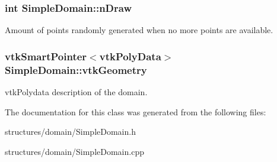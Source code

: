 \subsubsection[{\texorpdfstring{n\+Draw}{nDraw}}]{\setlength{\rightskip}{0pt plus 5cm}int Simple\+Domain\+::n\+Draw\hspace{0.3cm}{\ttfamily [private]}}\hypertarget{class_simple_domain_a3558a17833f49034ea65a9d6640403c4}{}\label{class_simple_domain_a3558a17833f49034ea65a9d6640403c4}
Amount of points randomly generated when no more points are available. 
\subsubsection[{\texorpdfstring{vtk\+Geometry}{vtkGeometry}}]{\setlength{\rightskip}{0pt plus 5cm}vtk\+Smart\+Pointer$<$vtk\+Poly\+Data$>$ Simple\+Domain\+::vtk\+Geometry\hspace{0.3cm}{\ttfamily [private]}}\hypertarget{class_simple_domain_ad3ac10554a0fa1a950c8a05858b9e13d}{}\label{class_simple_domain_ad3ac10554a0fa1a950c8a05858b9e13d}
vtk\+Polydata description of the domain. 

The documentation for this class was generated from the following files\+:\begin{DoxyCompactItemize}
\item 
structures/domain/Simple\+Domain.\+h\item 
structures/domain/Simple\+Domain.\+cpp\end{DoxyCompactItemize}
